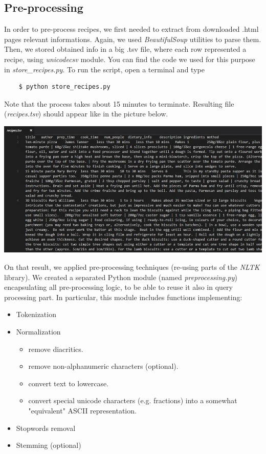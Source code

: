 \subsection{Pre-processing}

In order to pre-process recipes, we first needed to extract from downloaded .html pages relevant informations.  Again, we used \textit{BeautifulSoup}\cite{beaut_soup} utilities to parse them. Then, we stored obtained info in a big .tsv file, where each row represented a recipe, using \textit{unicodecsv}\cite{csv} module. You can find the code we used for this purpose in \textit{store\_recipes.py}. To run the script, open a terminal and type
\begin{lstlisting}
	$ python store_recipes.py
\end{lstlisting}
Note that the process takes about 15 minutes to terminate. Resulting file (\textit{recipes.tsv}) should appear like in the picture below.
\begin{center}
	\vspace{5mm}
	\includegraphics[scale=0.5]{img/recipes-tsv.jpg}
\end{center}
On that result, we applied pre-processing techniques (re-using parts of the \textit{NLTK}\cite{nltk} library). We created a separated Python module (named \textit{preprocessing.py}) encapsulating all pre-processing logic, to be able to reuse it also in query processing part. In particular, this module includes functions implementing:
\begin{itemize}
	\item Tokenization
	\item Normalization
	\begin{itemize}
		\item remove diacritics.
		\item remove non-alphanumeric characters (optional).
		\item convert text to lowercase.
		\item convert special unicode characters (e.g. fractions) into a somewhat "equivalent" ASCII representation.
	\end{itemize}
	\item Stopwords removal
	\item Stemming (optional)
\end{itemize}
